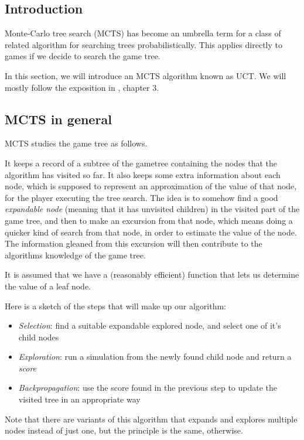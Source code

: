 \subsection {Introduction}


Monte-Carlo tree search (MCTS) has become an umbrella term for a class of related algorithm for searching trees probabilistically.
This applies directly to games if we decide to search the game tree.

In this section, we will introduce an MCTS algorithm known as UCT.
We will mostly follow the exposition in \citep{mcts_survey12}, chapter 3.

\subsection {MCTS in general}

MCTS studies the game tree as follows.

It keeps a record of a subtree of the gametree containing the nodes that the algorithm has visited so far.
It also keeps some extra information about each node, which is supposed to represent an approximation of the value of that node, for the player executing the tree search.
The idea is to somehow find a good \emph{expandable node} (meaning that it has unvisited children) in the visited part of the game tree, and then to make an excursion from that node, which means doing a quicker kind of search from that node, in order to estimate the value of the node. The information gleaned from this excursion will then contribute to the algorithms knowledge of the game tree.

It is assumed that we have a (reasonably efficient) function that lets us determine the value of a leaf node.

Here is a sketch of the steps that will make up our algorithm:

\begin{itemize}
\item \emph{Selection}: find a suitable expandable explored node, and select one of it's child nodes
\item \emph{Exploration}: run a simulation from the newly found child node and return a \emph{score}
\item \emph{Backpropagation}: use the score found in the previous step to update the visited tree in an appropriate way
\end{itemize}

Note that there are variants of this algorithm that expands and explores multiple nodes instead of just one, but the principle is the same, otherwise.

